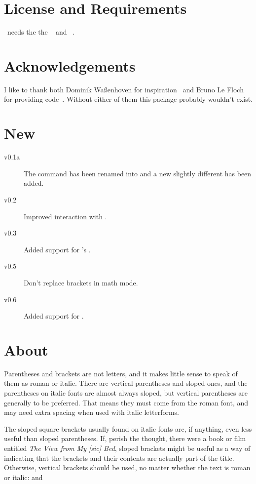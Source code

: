 \documentclass[load-preamble+]{cnltx-doc}
\begin{document}
\section{License and Requirements}
\license

\embrac\ needs the the ~\cite{bnd:l3kernel} and
~\cite{bnd:l3packages}.

\section{Acknowledgements}
I like to thank both Dominik Waßenhoven for inspiration~\cite{dtk12-dw} and
Bruno Le Floch for providing code~\cite{lefloch11}. Without either of them this
package probably wouldn't exist.

\section{New}
\begin{description}
 \item[v0.1a] The command  has been renamed into
    and a new slightly different  has been added.
 \item[v0.2] Improved interaction with .
 \item[v0.3] Added support for 's .
 \item[v0.5] Don't replace brackets in math mode.
 \item[v0.6] Added support for .
\end{description}

\section{About}\label{sec:about}
\begin{cnltxquote}
  Parentheses and brackets are not letters, and it makes little sense to speak
  of them as roman or italic.  There are vertical parentheses and sloped ones,
  and the parentheses on italic fonts are almost always sloped, but vertical
  parentheses are generally to be preferred.  That means they must come from
  the roman font, and may need extra spacing when used with italic
  letterforms.
 
  The sloped square brackets usually found on italic fonts are, if anything,
  even less useful than sloped parentheses.  If, perish the thought, there
  were a book or film entitled \emph*{The View from My [sic] Bed}, sloped
  brackets might be useful as a way of indicating that the brackets and their
  contents are actually part of the title.  Otherwise, vertical brackets
  should be used, no matter whether the text is roman or italic:
   and 
\end{cnltxquote}
\end{document}
